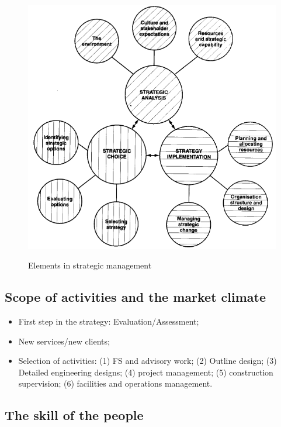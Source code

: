 \documentclass[a4paper,twoside,11pt]{article}
\begin{document}
\begin{figure}[!htb]
	\includegraphics[scale=2]{figures/elementsinstrategicmanagement} \\
	\caption{Elements in strategic management}
	\label{elementsinstrategicmanagement} 
\end{figure}

\subsection{Scope of activities and the market climate}
\begin{itemize}
\item First step in the strategy: Evaluation/Assessment;
\item New services/new clients;
\item Selection of activities: (1) FS and advisory work; (2) Outline design; (3) Detailed engineering designs; (4) project management; (5) construction supervision; (6) facilities and operations management.
\end{itemize}

\subsection{The skill of the people}
\end{document}

